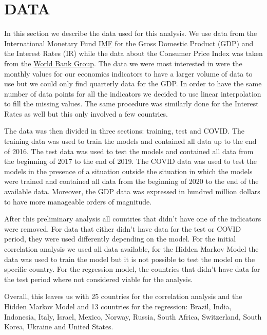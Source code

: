 \section{DATA}
\label{sec:data}

In this section we describe the data used for this analysis. We use data from the International Monetary Fund \href{https://www.imf.org/en/Data}{IMF} for the Gross Domestic Product (GDP) and the Interest Rates (IR) while the data about the Consumer Price Index was taken from the \href{https://www.worldbank.org/en/research/brief/inflation-database}{World Bank Group}. The data we were most interested in were the monthly values for our economics indicators to have a larger volume of data to use but we could only find quarterly data for the GDP. In order to have the same number of data points for all the indicators we decided to use linear interpolation to fill the missing values. The same procedure was similarly done for the Interest Rates as well but this only involved a few countries.

The data was then divided in three sections: training, test and COVID. The training data was used to train the models and contained all data up to the end of 2016. The test data was used to test the models and contained all data from the beginning of 2017 to the end of 2019. The COVID data was used to test the models in the presence of a situation outside the situation in which the models were trained and contained all data from the beginning of 2020 to the end of the available data. Moreover, the GDP data was expressed in hundred million dollars to have more manageable orders of magnitude.

After this preliminary analysis all countries that didn't have one of the indicators were removed. For data that either didn't have data for the test or COVID period, they were used differently depending on the model. For the initial correlation analysis we used all data available, for the Hidden Markov Model the data was used to train the model but it is not possible to test the model on the specific country. For the regression model, the countries that didn't have data for the test period where not considered viable for the analysis.

Overall, this leaves us with 25 countries for the correlation analysis and the Hidden Markov Model and 13 countries for the regression: Brazil, India, Indonesia, Italy, Israel, Mexico, Norway, Russia, South Africa, Switzerland, South Korea, Ukraine and United States.
